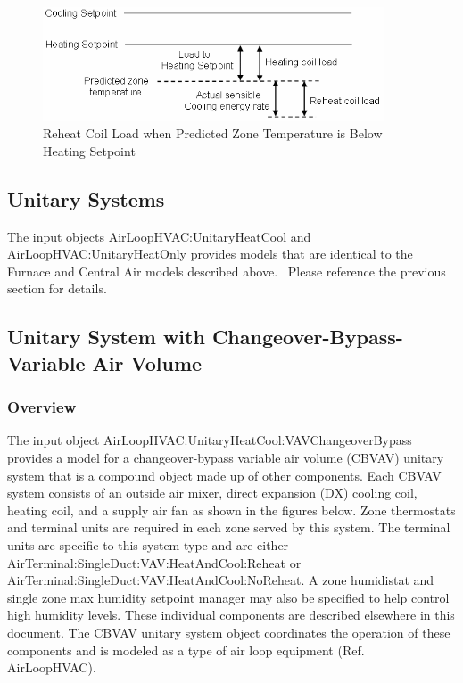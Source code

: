 \begin{figure}[hbtp] %
\centering
\includegraphics[width=0.9\textwidth, height=0.9\textheight, keepaspectratio=true]{media/image5051.png}
\caption{Reheat Coil Load when Predicted Zone Temperature is Below Heating Setpoint \protect \label{fig:reheat-coil-load-when-predicted-zone-001}}
\end{figure}

\subsection{Unitary Systems}\label{unitary-systems-1}

The input objects AirLoopHVAC:UnitaryHeatCool and AirLoopHVAC:UnitaryHeatOnly provides models that are identical to the Furnace and Central Air models described above.~ Please reference the previous section for details.

\subsection{Unitary System with Changeover-Bypass-Variable Air Volume}\label{unitary-system-with-changeover-bypass-variable-air-volume}

\subsubsection{Overview}\label{overview-2}

The input object AirLoopHVAC:UnitaryHeatCool:VAVChangeoverBypass provides a model for a changeover-bypass variable air volume (CBVAV) unitary system that is a compound object made up of other components. Each CBVAV system consists of an outside air mixer, direct expansion (DX) cooling coil, heating coil, and a supply air fan as shown in the figures below. Zone thermostats and terminal units are required in each zone served by this system. The terminal units are specific to this system type and are either AirTerminal:SingleDuct:VAV:HeatAndCool:Reheat or AirTerminal:SingleDuct:VAV:HeatAndCool:NoReheat. A zone humidistat and single zone max humidity setpoint manager may also be specified to help control high humidity levels. These individual components are described elsewhere in this document. The CBVAV unitary system object coordinates the operation of these components and is modeled as a type of air loop equipment (Ref. AirLoopHVAC).

